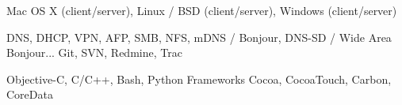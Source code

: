 
\cvcomputer
	{} {Mac OS X (client/server), Linux / BSD (client/server), Windows (client/server)}
	{} {}

\cvcomputer
	{} {DNS, DHCP, VPN, AFP, SMB, NFS, mDNS / Bonjour, DNS-SD / Wide Area Bonjour...}
	{} {Git, SVN, Redmine, Trac}

\cvcomputer
	{} {Objective-C, C/C++, Bash, Python}
	{Frameworks} {Cocoa, CocoaTouch, Carbon, CoreData}